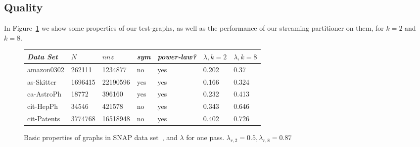 
\subsection{Quality}
In Figure~\ref{table:big} we show some properties of our test-graphs, as well as the performance of our streaming partitioner on them, for $k=2$ and $k=8$.

\begin{figure}
\caption{Basic properties of graphs in SNAP data set~\cite{Leskovec-data}, and $\lambda$ for one pass. $\lambda_{r,2}=0.5,\lambda_{r,8}=0.87$}
\centering
{ \begin{tabular}{ *7l }    \toprule
\label{table:big}
\emph{Data Set} & $N$ & $nnz$ & \emph{sym} & \emph{power-law?} & $\lambda, k=2$ & $\lambda, k=8$ \\\midrule
amazon0302 & 262111 & 1234877 & no & yes & 0.202&0.37\\
as-Skitter & 1696415 & 22190596 & yes & yes & 0.166&0.324\\
ca-AstroPh & 18772 & 396160 & yes & yes & 0.232&0.413\\
cit-HepPh & 34546 & 421578 & no & yes & 0.343&0.646\\
cit-Patents & 3774768 & 16518948 & no & yes & 0.402&0.726\\

\end{tabular}}
\end{figure}
